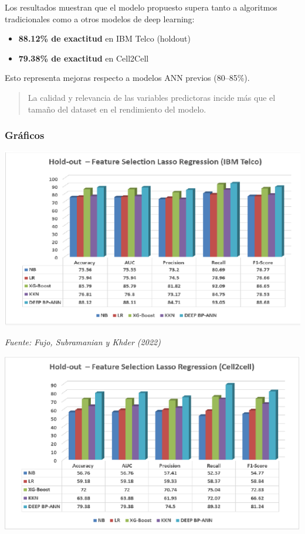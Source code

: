 \documentclass[
  letterpaper,
  DIV=11,
  numbers=noendperiod]{scrartcl}
\providecommand{\tightlist}{%
  \setlength{\itemsep}{0pt}\setlength{\parskip}{0pt}}\usepackage{longtable,booktabs,array}
\begin{document}
Los resultados muestran que el modelo propuesto supera tanto a
algoritmos tradicionales como a otros modelos de deep learning:

\begin{itemize}
\tightlist
\item
  \textbf{88.12\% de exactitud} en IBM Telco (holdout)
\item
  \textbf{79.38\% de exactitud} en Cell2Cell
\end{itemize}

Esto representa mejoras respecto a modelos ANN previos (80--85\%).

\begin{quote}
La calidad y relevancia de las variables predictoras incide más que el
tamaño del dataset en el rendimiento del modelo.
\end{quote}

\subsubsection{Gráficos}\label{gruxe1ficos}

\includegraphics{imagenes/grafica_01.png}

\emph{Fuente: Fujo, Subramanian y Khder (2022)}

\includegraphics{imagenes/grafica_02.png}
\end{document}
